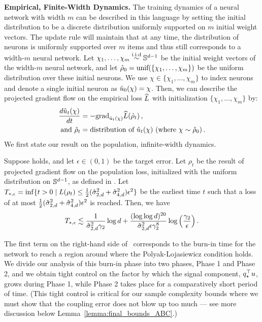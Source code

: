 \noindent \textbf{Empirical, Finite-Width Dynamics.}
The training dynamics of a neural network with width $m$ can be described in this language by setting the initial distribution to be a discrete distribution uniformly supported on $m$ initial weight vectors. The update rule will maintain that at any time, the distribution of neurons is uniformly supported over $m$ items and thus still corresponds to a width-$m$ neural network. Let $\chi_1,\dots, \chi_m \overset{\textup{i.i.d}}{\sim} \mathbb{S}^{d-1}$ be the initial weight vectors of the width-$m$ neural network, and let ${\hat{\rho}}_{0}  = \textup{unif}(\{\chi_1,\dots, \chi_m\}) $ be the uniform distribution over these initial neurons. We use $\chi \in\{\chi_1,\dots, \chi_m\}$ to index neurons and denote a single initial neuron as $\hat{u}_0(\chi)  = \chi$. Then, we can describe the projected gradient flow on the empirical loss $\widehat{L}$ with initialization $\{\chi_1,\dots, \chi_m\}$ by: 
\begin{align}
\frac{d\hat{u}_t(\chi)}{dt} & = - {\textup{grad}}_{\hat{u}_t(\chi)} \widehat{L}({\hat{\rho}}_t) \,, \\
    \text{ and } {\hat{\rho}}_t & = \textup{distribution of $\hat{u}_t(\chi)$ (where $\chi \sim {\hat{\rho}}_0$)}  \,.\label{eqn:rhohat_t}
\end{align}
We first state our result on the population, infinite-width dynamics. 
\begin{theorem} \label{thm:pop_main_thm}
Suppose  holds, and let $\epsilon \in (0, 1)$ be the target error. Let $\rho_t$ be the result of projected gradient flow on the population loss, initialized with the uniform distribution on $\mathbb{S}^{d - 1}$, as defined in . Let $T_{*, \epsilon} = \inf \{t > 0 \mid L(\rho_t) \leq \frac{1}{2}(\hat{\sigma}_{2, d}^2 + \hat{\sigma}_{4, d}^2) \epsilon^2\}$ be the earliest time $t$ such that a loss of at most $\frac{1}{2} (\hat{\sigma}_{2, d}^2 + \hat{\sigma}_{4, d}^2) \epsilon^2$ is reached. Then, we have 
\begin{align}
    T_{*, \epsilon} \lesssim \frac{1}{\hat{\sigma}_{2, d}^2 \gamma_2} \log d + \frac{(\log \log d)^{20}}{\hat{\sigma}_{2, d}^2 \epsilon \gamma_2^8} \log\Big(\frac{\gamma_2}{\epsilon}\Big) \,. \label{eqn:19}
\end{align}
\end{theorem}
The first term on the right-hand side of~ corresponds to the burn-in time for the network to reach a region around where the Polyak-Lojasiewicz condition holds. We divide our analysis of this burn-in phase into two phases, Phase 1 and Phase 2, and we obtain tight control on the factor by which the signal component, $q_\star^\top u$, grows during Phase 1, while Phase 2 takes place for a comparatively short period of time. (This tight control is critical for our sample complexity bounds where we must show that the coupling error does not blow up too much --- see more discussion below Lemma~\ref{lemma:final_bounds_ABC}.) 
